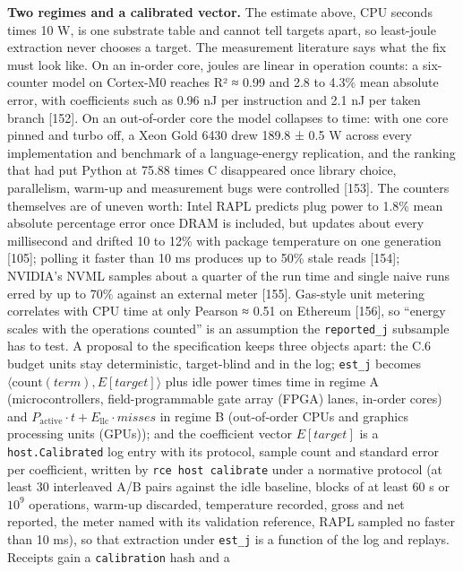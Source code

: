 \documentclass[10pt,letterpaper]{article}
\begin{document}
\textbf{Two regimes and a calibrated vector.} The estimate above, CPU
seconds times 10 W, is one substrate table and cannot tell targets
apart, so least-joule extraction never chooses a target. The measurement
literature says what the fix must look like. On an in-order core, joules
are linear in operation counts: a six-counter model on Cortex-M0 reaches
R² ≈ 0.99 and 2.8 to 4.3\% mean absolute error, with coefficients such
as 0.96 nJ per instruction and 2.1 nJ per taken branch {[}152{]}. On an
out-of-order core the model collapses to time: with one core pinned and
turbo off, a Xeon Gold 6430 drew 189.8 ± 0.5 W across every
implementation and benchmark of a language-energy replication, and the
ranking that had put Python at 75.88 times C disappeared once library
choice, parallelism, warm-up and measurement bugs were controlled
{[}153{]}. The counters themselves are of uneven worth: Intel RAPL
predicts plug power to 1.8\% mean absolute percentage error once DRAM is
included, but updates about every millisecond and drifted 10 to 12\%
with package temperature on one generation {[}105{]}; polling it faster
than 10 ms produces up to 50\% stale reads {[}154{]}; NVIDIA's NVML
samples about a quarter of the run time and single naive runs erred by
up to 70\% against an external meter {[}155{]}. Gas-style unit metering
correlates with CPU time at only Pearson ≈ 0.51 on Ethereum {[}156{]},
so ``energy scales with the operations counted'' is an assumption the
\texttt{reported\_j} subsample has to test. A proposal to the
specification keeps three objects apart: the C.6 budget units stay
deterministic, target-blind and in the log; \texttt{est\_j} becomes
\(\langle \mathrm{count}(\mathit{term}), E[\mathit{target}] \rangle\)
plus idle power times time in regime A (microcontrollers,
field-programmable gate array (FPGA) lanes, in-order cores) and
\(P_{\mathrm{active}} \cdot t + E_{\mathrm{llc}} \cdot \mathit{misses}\)
in regime B (out-of-order CPUs and graphics processing units (GPUs));
and the coefficient vector \(E[\mathit{target}]\) is a
\texttt{host.Calibrated} log entry with its protocol, sample count and
standard error per coefficient, written by \texttt{rce\ host\ calibrate}
under a normative protocol (at least 30 interleaved A/B pairs against
the idle baseline, blocks of at least 60 s or \(10^9\) operations,
warm-up discarded, temperature recorded, gross and net reported, the
meter named with its validation reference, RAPL sampled no faster than
10 ms), so that extraction under \texttt{est\_j} is a function of the
log and replays. Receipts gain a \texttt{calibration} hash and a
\end{document}

